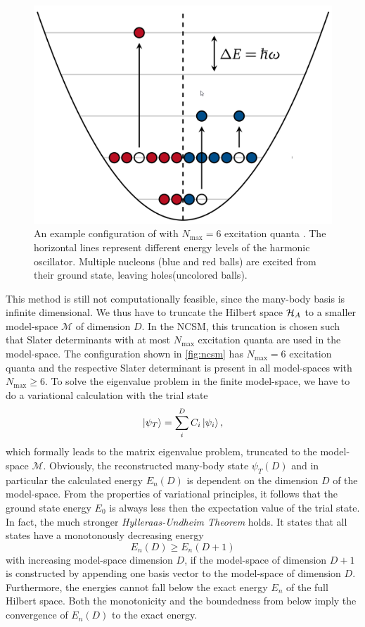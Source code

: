 \begin{figure}
  \includegraphics[width=.4\textwidth]{media/ncsm.png}
  \caption{An example configuration of  with $N_\mathrm{max} = 6$ excitation quanta \cite{sommerschule}. The horizontal lines represent different energy levels of the harmonic oscillator. Multiple nucleons (blue and red balls) are excited from their ground state, leaving holes(uncolored balls).}
  \label{fig:ncsm}
\end{figure}
This method is still not computationally feasible, since the many-body basis is infinite dimensional. We thus have to truncate the Hilbert space $\mathcal{H}_A$ to a smaller model-space $\mathcal{M}$ of dimension $D$. In the NCSM, this truncation is chosen such that Slater determinants with at most $N_\mathrm{max}$ excitation quanta are used in the model-space. The  configuration shown in \autoref{fig:ncsm} has $N_\mathrm{max} = 6$ excitation quanta and the respective Slater determinant is present in all model-spaces with $N_\mathrm{max} \geq 6$.
To solve the eigenvalue problem in the finite model-space, we have to do a variational calculation with the trial state
\begin{equation}
  \ket{\psi_T} = \sum_i^{D} C_i \ket{\psi_i},
\end{equation}
which formally leads to the matrix eigenvalue problem, truncated to the model-space $\mathcal{M}$. Obviously, the reconstructed many-body state $\psi_T(D)$ and in particular the calculated energy $E_n(D)$ is dependent on the dimension $D$ of the model-space. From the properties of variational principles, it follows that the ground state energy $E_0$ is always less then the expectation value of the trial state. In fact, the much stronger \textit{Hylleraas-Undheim Theorem} holds. It states that all states have a monotonously decreasing energy
\begin{equation}
  E_n(D) \geq E_n(D+1)
\end{equation}
with increasing model-space dimension $D$, if the model-space of dimension $D+1$ is constructed by appending one basis vector to the model-space of dimension $D$. Furthermore, the energies cannot fall below the exact energy $E_n$ of the full Hilbert space. Both the monotonicity and the boundedness from below imply the convergence of $E_n(D)$ to the exact energy.

